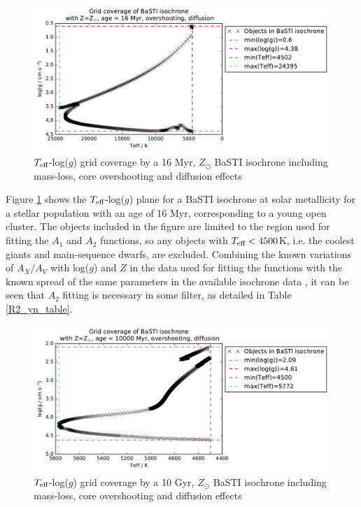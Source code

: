 \documentclass[12pt, a4paper]{report}
\begin{document}
\begin{figure}[h]
\begin{center}
\includegraphics[scale=0.7]{../wfc3_16_23Myr_10Gyr_complex_solar/wfc3_ATLAS9_grid_BaSTI_coverage_c16_complex_Zsol_4500.pdf}
\caption{$T_{\textnormal{eff}}$-log($g$) grid coverage by a 16 Myr, $Z_{\odot}$ BaSTI isochrone including mass-loss, core overshooting and diffusion effects}
\label{BaSTI_coverage_16M}
\end{center}
\end{figure}

Figure \ref{BaSTI_coverage_16M} shows the $T_{\textnormal{eff}}$-log($g$) plane for a BaSTI isochrone at solar metallicity for a stellar population with an age of 16 Myr, corresponding to a young open cluster. The objects included in the figure are limited to the region used for fitting the $A_{1}$ and $A_{2}$ functions, so any objects with $T_{\textnormal{eff}} < 4500$K, i.e. the coolest giants and main-sequence dwarfs, are excluded. Combining the known variations of $A_{X}/A_{V}$ with log($g$) and $Z$ in the data used for fitting the functions with the known spread of the same parameters in the available isochrone data \citep{2013A&A...558A..46P}, it can be seen that $A_{2}$ fitting is necessary in some filter, as detailed in Table \ref{R2_yn_table}.

\begin{figure}[h]
\begin{center}
\includegraphics[scale=0.7]{../wfc3_16_23Myr_10Gyr_complex_solar/wfc3_ATLAS9_grid_BaSTI_coverage_c10000_complex_Zsol_4500.pdf}
\caption{$T_{\textnormal{eff}}$-log($g$) grid coverage by a 10 Gyr, $Z_{\odot}$ BaSTI isochrone including mass-loss, core overshooting and diffusion effects}
\label{BaSTI_coverage_10G}
\end{center}
\end{figure}
\end{document}

